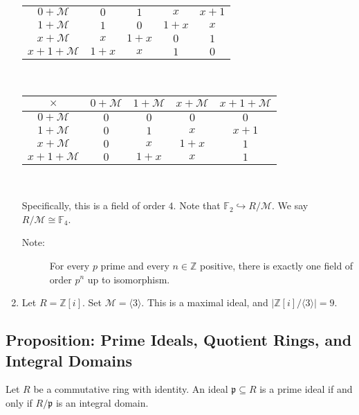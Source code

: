 \documentclass[10pt]{extarticle}
\newcommand{\Z}{\mathbb{Z}}
\begin{document}
\begin{enumerate}[(1)]
\begin{center}
\begin{tabular}{c|cccc}
          \hline
          $0 + \mathcal{M}$ & $0$ & $1$ & $x$ & $x+1$\\
          $1 + \mathcal{M}$ & $1$ & $0$ & $1+x$ & $x$\\
          $x + \mathcal{M}$ & $x$ & $1+x$ & $0$ & $1$\\
          $x+1 + \mathcal{M}$ & $1+x$ & $x$ & $1$ & $0$
        \end{tabular}\\
        \begin{tabular}{c|cccc}
          $\times$ & $0 + \mathcal{M}$ & $1 + \mathcal{M}$ & $x + \mathcal{M}$ & $x+1 + \mathcal{M}$\\
          \hline
          $0 + \mathcal{M}$ & $0$ & $0$ & $0$ & $0$\\
          $1 + \mathcal{M}$ & $0$ & $1$ & $x$ & $x+1$\\
          $x + \mathcal{M}$ & $0$ & $x$ & $1+x$ & $1$\\
          $x+1 + \mathcal{M}$ & $0$ & $1+x$ & $x$ & $1$
        \end{tabular}\\
      \end{center}
      Specifically, this is a field of order $4$. Note that $\mathbb{F}_2 \hookrightarrow R/\mathcal{M}$. We say $R/\mathcal{M} \cong \mathbb{F}_4$. 
      \begin{description}
        \item[Note:] For every $p$ prime and every $n\in \Z$ positive, there is exactly one field of order $p^n$ up to isomorphism.
      \end{description}
    \item Let $R = \Z[i]$. Set $\mathcal{M} = \langle 3\rangle$. This is a maximal ideal, and $|\Z[i]/\langle 3 \rangle| = 9$.
  \end{enumerate}
  \subsection{Proposition: Prime Ideals, Quotient Rings, and Integral Domains}%
  Let $R$ be a commutative ring with identity. An ideal $\mathfrak{p}\subseteq R$ is a prime ideal if and only if $R/\mathfrak{p}$ is an integral domain.\\
\end{document}
